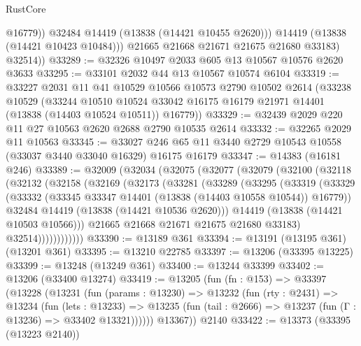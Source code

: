 \begin{lexlean}{RustCore}
\begin{coremodule}
                  @16779))
              @32484
              @14419
              (@13838 (@14421 @10455 @2620)))
            @14419
            (@13838 (@14421 @10423 @10484)))
          @21665
          @21668
          @21671
          @21675
          @21680
          @33183)
        @32514))
@33289 := @32326 @10497 @2033 @605 @13 @10567 @10576 @2620 @3633
@33295 := @33101 @2032 @44 @13 @10567 @10574 @6104
@33319 := @33227
    @2031
    @11
    @41
    @10529
    @10566
    @10573
    @2790
    @10502
    @2614
    (@33238
      @10529
      (@33244
        @10510
        @10524
        @33042
        @16175
        @16179
        @21971
        @14401
        (@13838 (@14403 @10524 @10511))
        @16779))
@33329 := @32439 @2029 @220 @11 @27 @10563 @2620 @2688 @2790 @10535 @2614
@33332 := @32265 @2029 @11 @10563
@33345 := @33027 @246 @65 @11 @3440 @2729 @10543 @10558 (@33037 @3440 @33040 @16329) @16175 @16179
@33347 := @14383 (@16181 @246)
@33389 := @32009
    (@32034
      (@32075
        (@32077
          (@32079
            (@32100
              (@32118
                (@32132
                  (@32158
                    (@32169
                      (@32173
                        (@33281
                          (@33289
                            (@33295
                              (@33319
                                (@33329
                                  (@33332
                                    (@33345 @33347 @14401 (@13838 (@14403 @10558 @10544)) @16779))
                                  @32484
                                  @14419
                                  (@13838 (@14421 @10536 @2620)))
                                @14419
                                (@13838 (@14421 @10503 @10566)))
                              @21665
                              @21668
                              @21671
                              @21675
                              @21680
                              @33183)
                            @32514))))))))))))
@33390 := @13189 @361
@33394 := @13191 (@13195 @361) (@13201 @361)
@33395 := @13210 @22785
@33397 := @13206 (@33395 @13225)
@33399 := @13248 (@13249 @361)
@33400 := @13244 @33399
@33402 := @13206 (@33400 @13274)
@33419 := @13205
    (fun (fn : @153) =>
    @33397
      (@13228
        (@13231
          (fun (params : @13230) =>
          @13232
            (fun (rty : @2431) =>
            @13234
              (fun (lets : @13233) =>
              @13235 (fun (tail : @2666) => @13237 (fun (Γ : @13236) => @33402 @13321))))))
        @13367))
    @2140
@33422 := @13373 (@33395 (@13223 @2140))

\end{coremodule}
\end{lexlean}

